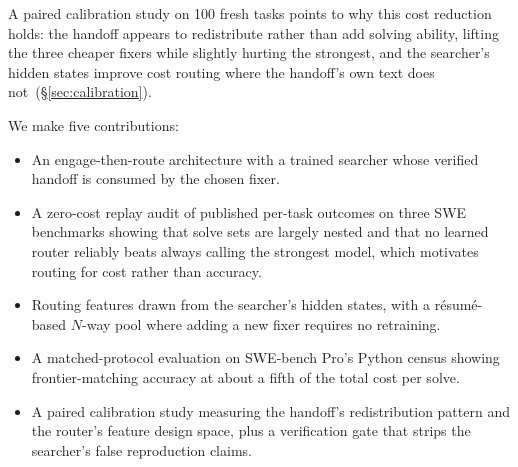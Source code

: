A paired calibration study on 100 fresh tasks points to why this cost
reduction holds: the handoff appears to redistribute rather than add
solving ability, lifting the three cheaper fixers while slightly hurting
the strongest, and the
searcher's hidden states improve cost routing where the handoff's own
text does not~(\S\ref{sec:calibration}).

We make five contributions:
\begin{itemize}
  \item An engage-then-route architecture with a trained searcher whose
    verified handoff is consumed by the chosen fixer.
  \item A zero-cost replay audit of published per-task outcomes on three
    SWE benchmarks showing that solve sets are largely nested and that no
    learned router reliably beats always calling the strongest model,
    which motivates routing for cost rather than accuracy.
  \item Routing features drawn from the searcher's hidden states, with a
    r\'esum\'e-based $N$-way pool where adding a new fixer requires no
    retraining.
  \item A matched-protocol evaluation on SWE-bench Pro's Python census
    showing frontier-matching accuracy at about a fifth of the total
    cost per solve.
  \item A paired calibration study measuring the handoff's
    redistribution pattern and the router's feature design space, plus a
    verification gate that strips the searcher's false reproduction
    claims.
\end{itemize}
